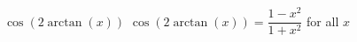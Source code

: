  {$\cos \left( 2\arctan \left( x \right) \right)$ }
{ $\cos \left( 2\arctan \left( x \right) \right) = \dfrac{1 - x^{2}}{1 + x^{2}}$ for all $x$}
